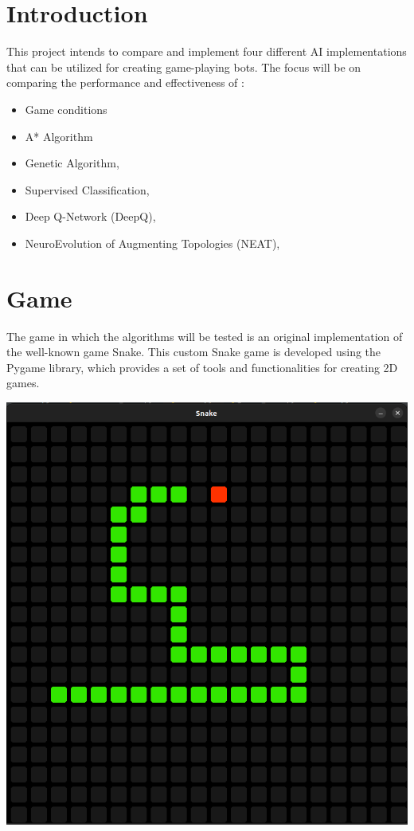 \section{Introduction}

This project intends to compare and implement four different AI implementations that can be utilized for creating game-playing bots. The focus will be on comparing the performance and effectiveness of :
\begin{itemize}
    \item Game conditions
    \item A* Algorithm
    \item Genetic Algorithm,
    \item Supervised Classification,
    \item Deep Q-Network (DeepQ),
    \item NeuroEvolution of Augmenting Topologies (NEAT),
\end{itemize}

\section{Game}

The game in which the algorithms will be tested is an original implementation of the well-known game Snake. This custom Snake game is developed using the Pygame library, which provides a set of tools and functionalities for creating 2D games. 

\includegraphics[width=\textwidth]{snakeGame}
